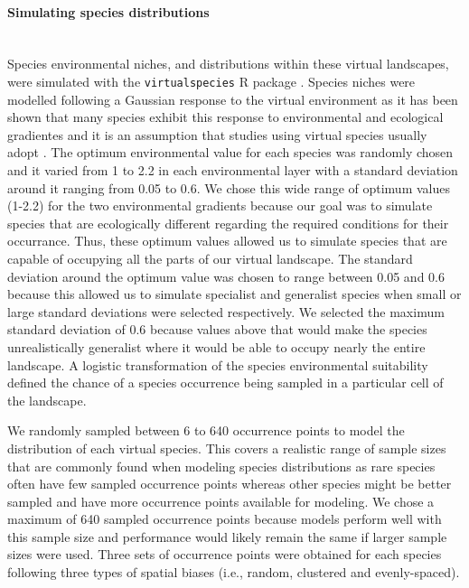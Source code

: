 \paragraph*{Simulating species distributions}\mbox{}\\ 
Species environmental niches, and distributions within these virtual landscapes, were simulated with the \texttt{virtualspecies} R package \parencite{leroy2016}. Species niches were modelled following a Gaussian response to the virtual environment as it has been shown that many species exhibit this response to environmental and ecological gradientes \parencite{oksanen2002, boucher2014} and it is an assumption that studies using virtual species usually adopt \parencite{varela2014,van2016}. The optimum environmental value for each species was randomly chosen and it varied from 1 to 2.2 in each environmental layer with a standard deviation around it ranging from 0.05 to 0.6. We chose this wide range of optimum values (1-2.2) for the two environmental gradients because our goal was to simulate species that are ecologically different regarding the required conditions for their occurrance. Thus, these optimum values allowed us to simulate species that are capable of occupying all the parts of our virtual landscape. The standard deviation around the optimum value was chosen to range between 0.05 and 0.6 because this allowed us to simulate specialist and generalist species when small or large standard deviations were selected respectively. We selected the maximum standard deviation of 0.6 because values above that would make the species unrealistically generalist where it would be able to occupy nearly the entire landscape. A logistic transformation of the species environmental suitability defined the chance of a species occurrence being sampled in a particular cell of the landscape. 


We randomly sampled between 6 to 640 occurrence points to model the distribution of each virtual species. This covers a realistic range of sample sizes that are commonly found when modeling species distributions as rare species often have few sampled occurrence points whereas other species might be better sampled and have more occurrence points available for modeling. We chose a maximum of 640 sampled occurrence points because models perform well with this sample size and performance would likely remain the same if larger sample sizes were used. Three sets of occurrence points were obtained for each species following three types of spatial biases (i.e., random, clustered and evenly-spaced). 

